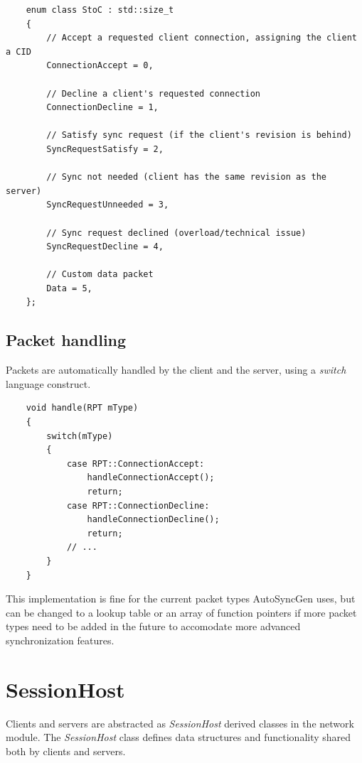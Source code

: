 \documentclass{report}
\begin{document}
                    \begin{verbatim}
    enum class StoC : std::size_t
    {
        // Accept a requested client connection, assigning the client a CID
        ConnectionAccept = 0,       
        
        // Decline a client's requested connection
        ConnectionDecline = 1,      

        // Satisfy sync request (if the client's revision is behind)
        SyncRequestSatisfy = 2,     

        // Sync not needed (client has the same revision as the server)
        SyncRequestUnneeded = 3,    

        // Sync request declined (overload/technical issue)
        SyncRequestDecline = 4,     

        // Custom data packet
        Data = 5,                   
    };
                    \end{verbatim}
            
            \subsection{Packet handling}
                Packets are automatically handled by the client and the server, using a \emph{switch} language construct.

                \begin{verbatim}
    void handle(RPT mType)
    {
        switch(mType)
        {
            case RPT::ConnectionAccept:
                handleConnectionAccept();
                return;
            case RPT::ConnectionDecline:
                handleConnectionDecline();
                return;
            // ...
        }
    }
                \end{verbatim}

                This implementation is fine for the current packet types AutoSyncGen uses, but can be changed to a lookup table or an array of function pointers if more packet types need to be added in the future to accomodate more advanced synchronization features.

        \section{SessionHost}

            Clients and servers are abstracted as \emph{SessionHost} derived classes in the network module.
            The \emph{SessionHost} class defines data structures and functionality shared both by clients and servers.
\end{document}
